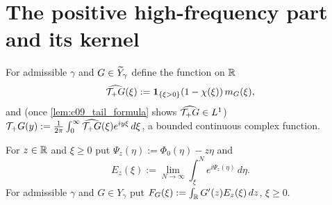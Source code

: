 \section{The positive high-frequency part and its kernel}

\begin{definition}
  \label{def:c09_T_plus}
  For admissible $\gamma$ and $G\in\widetilde{Y}_\gamma$ define the function on $\mathbb{R}$
  \[
    \widehat{\mathcal{T}_+G}(\xi):=\mathbf 1_{\{\xi>0\}}(1-\chi(\xi))\,m_G(\xi),
  \]
  and (once \cref{lem:c09_tail_formula} shows $\widehat{\mathcal{T}_+G}\in L^1$)
  $\mathcal{T}_+G(y):=\frac1{2\pi}\int_0^\infty\widehat{\mathcal{T}_+G}(\xi)e^{iy\xi}\,d\xi$, a bounded continuous complex function.
\end{definition}

\begin{definition}
  \label{def:c09_tail_integral}
  For $z\in\mathbb{R}$ and $\xi\ge0$ put $\Psi_z(\eta):=\Phi_0(\eta)-z\eta$ and
  \[
    E_z(\xi):=\lim_{N\to\infty}\int_\xi^Ne^{i\Psi_z(\eta)}\,d\eta .
  \]
  For admissible $\gamma$ and $G\in Y_\gamma$ put $F_G(\xi):=\int_{\mathbb{R}} G'(z)E_z(\xi)\,dz$, $\xi\ge0$.
\end{definition}

